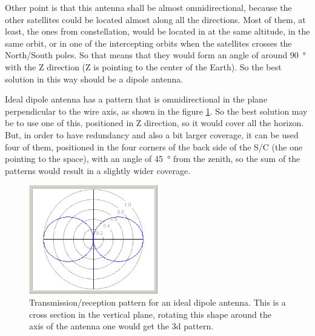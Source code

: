 Other point is that this antenna shall be almost omnidirectional, because
the other satellites could be located almost along all the directions. Most of
them, at least, the ones from \MissionName constellation, would be located in
at the same altitude, in the same orbit, or in one of the intercepting orbits when
the satellites crosses the North/South poles. So that means that they would form
an angle of around \SI{90}{\degree} with the Z direction (Z is pointing to the
center of the Earth). So the best solution in this way should be a dipole antenna.

Ideal dipole antenna has a pattern that is omnidirectional in the plane perpendicular
to the wire axis, as shown in the figure \ref{fig:dipole_pattern}. So the best solution
may be to use one of this, positioned in Z direction, so it would cover all the
horizon. But, in order to have redundancy and also a bit larger coverage, it can
be used four of them, positioned in the four corners of the back side of the
S/C (the one pointing to the space), with an angle of \SI{45}{\degree} from the zenith, so
the sum of the patterns would result in a slightly wider coverage.

\begin{figure}[h!]
	\centering
	\includegraphics[width=0.5\textwidth]{img/Dipole_pattern.png}
	\caption[Ideal dipole radiation pattern]{Transmission/reception pattern for an ideal dipole antenna.
	This is a cross section in the vertical plane, rotating this shape around
	the axis of the antenna one would get the 3d pattern.}
	\label{fig:dipole_pattern}
\end{figure}
